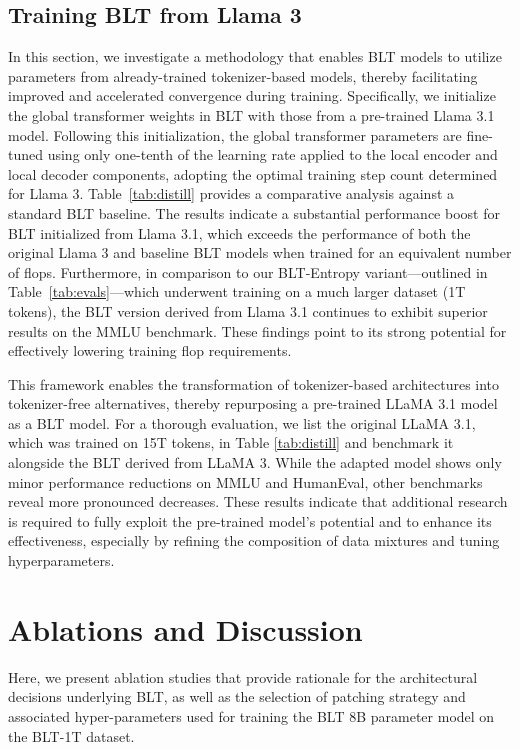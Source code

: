\subsection{Training {\textsc BLT} from Llama 3}
\label{sec:distillation}
In this section, we investigate a methodology that enables {\textsc BLT} models to utilize parameters from already-trained tokenizer-based models, thereby facilitating improved and accelerated convergence during training. Specifically, we initialize the global transformer weights in {\textsc BLT} with those from a pre-trained Llama 3.1 model. Following this initialization, the global transformer parameters are fine-tuned using only one-tenth of the learning rate applied to the local encoder and local decoder components, adopting the optimal training step count determined for Llama 3. Table~\ref{tab:distill} provides a comparative analysis against a standard {\textsc BLT} baseline. The results indicate a substantial performance boost for {\textsc BLT} initialized from Llama 3.1, which exceeds the performance of both the original Llama 3 and baseline {\textsc BLT} models when trained for an equivalent number of flops. Furthermore, in comparison to our {\textsc BLT}-Entropy variant—outlined in Table~\ref{tab:evals}—which underwent training on a much larger dataset (1T tokens), the {\textsc BLT} version derived from Llama 3.1 continues to exhibit superior results on the MMLU benchmark. These findings point to its strong potential for effectively lowering training flop requirements.

This framework enables the transformation of tokenizer-based architectures into tokenizer-free alternatives, thereby repurposing a pre-trained LLaMA 3.1 model as a {\textsc BLT} model. For a thorough evaluation, we list the original LLaMA 3.1, which was trained on 15T tokens, in Table \ref{tab:distill} and benchmark it alongside the {\textsc BLT} derived from LLaMA 3. While the adapted model shows only minor performance reductions on MMLU and HumanEval, other benchmarks reveal more pronounced decreases. These results indicate that additional research is required to fully exploit the pre-trained model’s potential and to enhance its effectiveness, especially by refining the composition of data mixtures and tuning hyperparameters.

\section{Ablations and Discussion}
\label{section:ablations}
Here, we present ablation studies that provide rationale for the architectural decisions underlying {\textsc BLT}, as well as the selection of patching strategy and associated hyper-parameters used for training the {\textsc BLT} 8B parameter model on the {\textsc BLT}-1T dataset.

